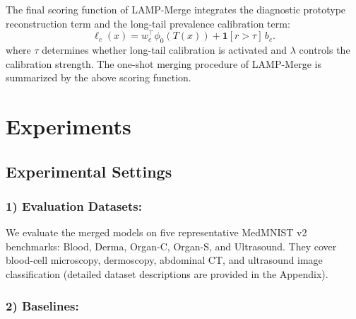 \documentclass[letterpaper]{article} %
\begin{document}
The final scoring function of LAMP-Merge integrates the diagnostic prototype reconstruction term and the long-tail prevalence calibration term:
\begin{equation}
\ell_c(x)=w_c^\top\phi_0(T(x))+\mathbf{1}[r>\tau]\,b_c.
\end{equation}
where $\tau$ determines whether long-tail calibration is activated and $\lambda$ controls the calibration strength. The one-shot merging procedure of LAMP-Merge is summarized by the above scoring function.

\section{Experiments}

\subsection{Experimental Settings}

\subsubsection{1) Evaluation Datasets:}

We evaluate the merged models on five representative MedMNIST v2 benchmarks\cite{yang2023medmnist}: Blood, Derma, Organ-C, Organ-S, and Ultrasound. They cover blood-cell microscopy, dermoscopy, abdominal CT, and ultrasound image classification (detailed dataset descriptions are provided in the Appendix).

\subsubsection{2) Baselines:}
\end{document}

